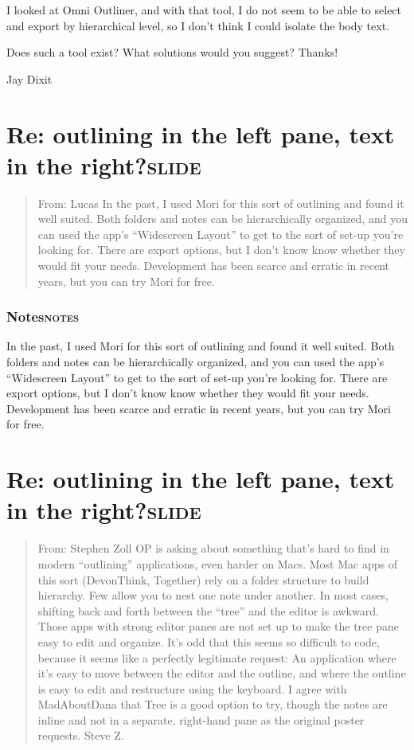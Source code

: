 \documentclass[11pt]{article}
\begin{document}
I looked at Omni Outliner, and with that tool, I do not seem to be able to select and export by hierarchical level, so I don't think I could isolate the body text.

Does such a tool exist? What solutions would you suggest? Thanks! 

Jay Dixit

\section{Re: outlining in the left pane, text in the right?\hfill{}\textsc{slide}}
\label{sec:orgheadline22}
\begin{quote}
From: Lucas 
In the past, I used Mori for this sort of outlining and found it well suited. Both folders and notes can be hierarchically organized, and you can used the app's ``Widescreen Layout'' to get to the sort of set-up you're looking for. There are export options, but I don't know know whether they would fit your needs. Development has been scarce and erratic in recent years, but you can try Mori for free. 
\end{quote}

\subsubsection{Notes\hfill{}\textsc{notes}}
\label{sec:orgheadline21}
In the past, I used Mori for this sort of outlining and found it well suited. Both folders and notes can be hierarchically organized, and you can used the app's ``Widescreen Layout'' to get to the sort of set-up you're looking for. There are export options, but I don't know know whether they would fit your needs. Development has been scarce and erratic in recent years, but you can try Mori for free. 

\section{Re: outlining in the left pane, text in the right?\hfill{}\textsc{slide}}
\label{sec:orgheadline24}
\begin{quote}
From: Stephen Zoll 
OP is asking about something that's hard to find in modern ``outlining'' applications, even harder on Macs. Most Mac apps of this sort (DevonThink, Together) rely on a folder structure to build hierarchy. Few allow you to nest one note under another. In most cases, shifting back and forth between the ``tree'' and the editor is awkward. Those apps with strong editor panes are not set up to make the tree pane easy to edit and organize. It's odd that this seems so difficult to code, because it seems like a perfectly legitimate request: An application where it's easy to move between the editor and the outline, and where the outline is easy to edit and restructure using the keyboard. I agree with MadAboutDana that Tree is a good option to try, though the notes are inline and not in a separate, right-hand pane as the original poster requests. Steve Z. 
\end{quote}
\end{document}
